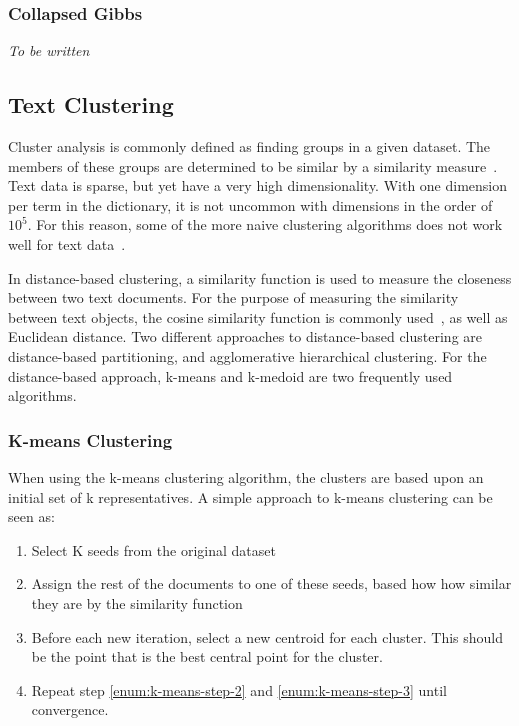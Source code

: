 \subsubsection{Collapsed Gibbs}

\textit{To be written}

\subsection{Text Clustering}

Cluster analysis is commonly defined as finding groups in a given dataset.
The members of these groups are determined to be similar by a similarity measure~\cite{kaufman2009finding, aggarwal2012survey}.
Text data is sparse, but yet have a very high dimensionality.
With one dimension per term in the dictionary, it is not uncommon with dimensions in the order of $10^5$.
For this reason, some of the more naive clustering algorithms does not work well for text data~\cite{aggarwal2012survey}.

In distance-based clustering, a similarity function is used to measure the closeness between two text documents.
For the purpose of measuring the similarity between text objects, the cosine similarity function is commonly used~\cite{aggarwal2012survey}, as well as Euclidean distance.
Two different approaches to distance-based clustering are distance-based partitioning, and agglomerative hierarchical clustering.
For the distance-based approach, k-means and k-medoid are two frequently used algorithms.

\subsubsection{K-means Clustering}\label{sec:k-means}

When using the k-means clustering algorithm, the clusters are based upon an initial set of k representatives.
A simple approach to k-means clustering can be seen as:

\begin{enumerate}
    \item Select K seeds from the original dataset
    \item \label{enum:k-means-step-2} Assign the rest of the documents to one of these seeds, based how how similar they are by the similarity function
    \item \label{enum:k-means-step-3} Before each new iteration, select a new centroid for each cluster. This should be the point that is the best central point for the cluster.
    \item Repeat step \ref{enum:k-means-step-2} and \ref{enum:k-means-step-3} until convergence.
\end{enumerate}

